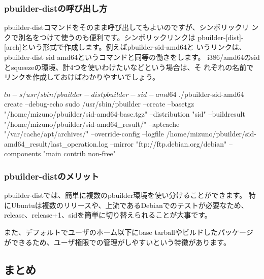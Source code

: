 \documentclass[mingoth,a4paper]{jsarticle}
\begin{document}

\subsubsection{pbuilder-distの呼び出し方}

pbuilder-distコマンドをそのまま呼び出してもよいのですが、シンボリックリ
ンクで別名をつけて使うのも便利です。シンボリックリンクは
pbuilder-[dist]-[arch]という形式で作成します。例えばpbuilder-sid-amd64と
いうリンクは、pbuilder-dist sid amd64というコマンドと同等の働きをします。
i386/amd64のsidとsqueezeの環境、計4つを使いわけたいなどという場合は、そ
れぞれの名前でリンクを作成しておけばわかりやすいでしょう。

\begin{commandline}
$ ln -s /usr/sbin/pbuilder-dist pbuilder-sid-amd64
$ ./pbuilder-sid-amd64 create --debug-echo
sudo /usr/sbin/pbuilder --create --basetgz "/home/mizuno/pbuilder/sid-amd64-base.tgz" --distribution "sid"
--buildresult "/home/mizuno/pbuilder/sid-amd64_result/" --aptcache "/var/cache/apt/archives/"
--override-config --logfile /home/mizuno/pbuilder/sid-amd64_result/last_operation.log
--mirror "ftp://ftp.debian.org/debian" --components "main contrib non-free"
\end{commandline}

\subsubsection{pbuilder-distのメリット}

pbuilder-distでは、簡単に複数のpbuilder環境を使い分けることができます。
特にUbuntuは複数のリリースや、上流であるDebianでのテストが必要なため、
release、release+1、sidを簡単に切り替えられることが大事です。

また、デフォルトでユーザのホーム以下にbase tarballやビルドしたパッケージ
ができるため、ユーザ権限での管理がしやすいという特徴があります。

\subsection{まとめ}
\end{document}
